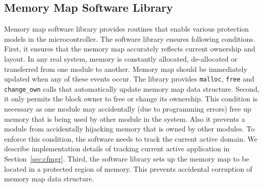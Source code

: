 \subsection{Memory Map Software Library}
\label{subsec:mmap_for_protection}
%
Memory map software library provides routines that enable various protection models in the microcontroller.
%
%
%
The software library ensures following conditions.
%
First, it ensures that the memory map accurately reflects current ownership and layout.
%
In any real system, memory is constantly allocated, de-allocated or transferred from one module to another.
%
Memory map should be immediately updated when any of these events occur.
%
The library provides \texttt{malloc}, \texttt{free} and \texttt{change\_own} calls that automatically update memory map data structure. 
%
Second, it only permits the  block owner to free or change its ownership.
%
This condition is necessary as one module may accidentally (due to programming errors) free up memory that is being used by other module in the system.
%
Also it prevents a module from accidentally hijacking memory that is owned by other modules.
%
To enforce this condition, the software needs to track the current active domain.
%
We describe implementation details of tracking current active application in Section~\ref{sec:cfmgr}.
%
Third, the software library sets up the memory map to be located in a protected region of memory.
%
This prevents accidental corruption of memory map data structure.
%








